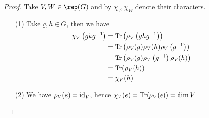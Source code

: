 \documentclass[twoside = false,	%
		headsepline,		%
		parskip = true,
		]{scrbook}						%
\begin{document}
        \begin{proof} Take $V,W \in \rep(G)$ and by $\chi_V,\chi_W$ denote their characters.
        
            \begin{enumerate}
                \item [(1)]
                    Take $g,h \in G$, then we have
                    \begin{align*}
                        \chi_V\left( ghg^{-1}\right)&=\mathrm{Tr}\left( \rho_V\left( ghg^{-1}\right)\right)\\
                        &=\mathrm{Tr}\left( \rho_V(g)\rho_V(h)\rho_V\left( g^{-1}\right)\right)\\
                        &=\mathrm{Tr}\left( \rho_V(g)\rho_V\left( g^{-1}\right)\rho_V(h)\right)\\
                        &= \mathrm{Tr}(\rho_V(h))\\
                        &= \chi_V(h)
                    \end{align*}

                \item [(2)]
                    We have $\rho_V(e)=\mathrm{id}_V$, hence $\chi_V(e) = \mathrm{Tr}(\rho_V(e)) = \dim V$
                

\end{enumerate}
\end{proof}
\end{document}
